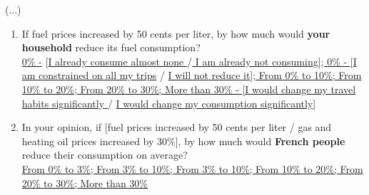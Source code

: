 \documentclass[english,5p,authoryear]{elsarticle}
\begin{document}
\begin{appendices}
(...)\uline{}
\begin{enumerate}[resume,leftmargin=*]
\item If fuel prices increased by 50 cents per liter, by how much would
\textbf{\textbf{your household}} reduce its fuel consumption? \uline{}\\
\uline{0\% -} {[}\uline{I already consume almost none }/\uline{ I am
already not consuming}{]}\uline{; 0\% - }{[}\uline{I am constrained
on all my trips} / \uline{I will not reduce it}{]}\uline{; From 0\%
to 10\%; From 10\% to 20\%; From 20\% to 30\%; More than 30\% - }{[}\uline{I
would change my travel habits significantly }/ \uline{I would change
my consumption significantly}{]}
\item In your opinion, if {[}fuel prices increased by 50 cents per liter
/ gas and heating oil prices increased by 30\%{]}, by how much would
\textbf{\textbf{French people}} reduce their consumption on average?
\uline{}\\
\uline{From 0\% to 3\%; From 3\% to 10\%; From 3\% to 10\%; From 10\%
to 20\%; From 20\% to 30\%; More than 30\%} 
\end{enumerate}


\end{appendices}
\end{document}
